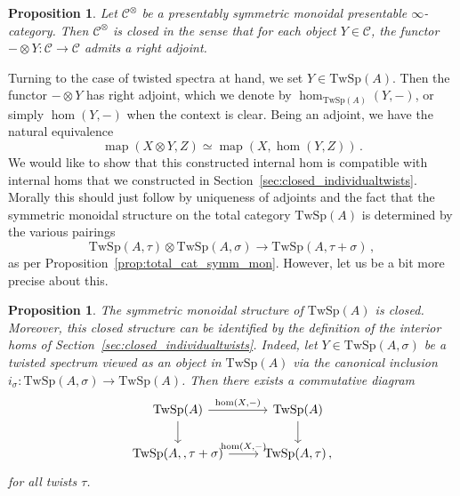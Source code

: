 \documentclass[10pt]{amsart}
\theoremstyle{plain}
\newtheorem{proposition}[theorem]{Proposition}
\theoremstyle{definition}
\DeclareMathOperator{\map}{map}
\newcommand{\cC}{\mathcal{C}}
\newcommand{\TwSp}{\mathrm{TwSp}}
\begin{document}
\begin{proposition}
    Let $\cC^{\otimes}$ be a presentably symmetric monoidal presentable $\infty$-category.
    Then $\cC^{\otimes}$ is closed in the sense that for each object $Y \in \cC$, the functor $- \otimes Y: \cC \to \cC $ admits a right adjoint.
\end{proposition}

Turning to the case of twisted spectra at hand, we set $Y \in \TwSp(A)$.
Then the functor $- \otimes Y$ has right adjoint, which we denote by $\hom_{\TwSp(A)}(Y, -)$, or simply $\hom(Y,-)$ when the context is clear.
Being an adjoint, we have the natural equivalence
\begin{equation}
    \map(X \otimes Y, Z) \simeq \map(X , \hom(Y,Z)) \,.
\end{equation}
We would like to show that this constructed internal hom is compatible with internal homs that we constructed in Section~\ref{sec:closed_individualtwists}.
Morally this should just follow by uniqueness of adjoints and the fact that the symmetric monoidal structure on the total category $\TwSp(A)$ is determined by the various pairings
\[
\TwSp(A, \tau)\otimes \TwSp(A, \sigma) \to \TwSp(A, \tau + \sigma) \,,
\]
as per Proposition~\ref{prop:total_cat_symm_mon}.
However, let us be a bit more precise about this.

\begin{proposition} \label{prop:closed_total_cat}
The symmetric monoidal structure of $\TwSp(A)$ is closed. Moreover, this closed structure can be identified by the definition of the interior homs of Section~\ref{sec:closed_individualtwists}. Indeed, let $Y \in \TwSp(A, \sigma)$ be a twisted spectrum viewed as an object in $\TwSp(A)$ via the canonical inclusion $i_{\sigma}: \TwSp(A, \sigma) \to \TwSp(A)$.
Then there exists a commutative diagram
\[
      \begin{tikzcd}
     \TwSp(A)  \arrow[r,"{\hom(X,-)}"] \arrow[d] & \TwSp(A) \arrow[d] \\
    \TwSp(A, , \tau + \sigma ) \arrow[r,"{\hom(X,-)}"] & \TwSp(A, \tau) \,,
  \end{tikzcd}
  \]
  for all twists $\tau$.
\end{proposition}
\end{document}
